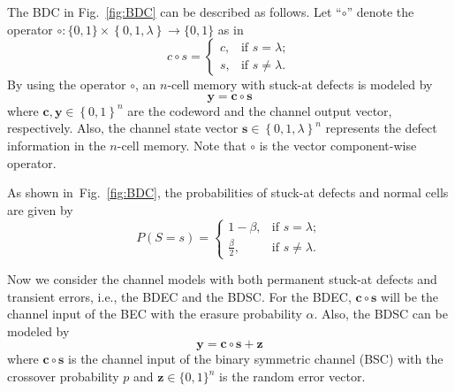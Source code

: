 \documentclass[10pt,twocolumn,twoside,submit]{JCNtran}
\begin{document}
	The BDC in Fig.~\ref{fig:BDC} can be described as follows. Let ``$\circ$'' denote the operator  $\circ:\{0, 1\} \times \left\{0, 1, \lambda\right\} \rightarrow \{0, 1\}$ as in~\cite{Heegard1983plbc}
	\begin{equation}\label{eq:circ_operator}
		c \circ s =
		\begin{cases}
		c, & \text{if } s = \lambda ; \\
		s, & \text{if } s \ne \lambda.
		\end{cases}
	\end{equation}
	By using the operator $\circ$, an $n$-cell memory with stuck-at defects is modeled by 
	\begin{equation}
	\mathbf{y} = \mathbf{c} \circ \mathbf{s} \label{eq:BDC_vector}
	\end{equation}
	where ${\mathbf{c}}, {\mathbf{y}}\in \left\{0, 1\right\}^n$ are the codeword and the channel output vector, respectively. Also, the channel state vector ${\mathbf{s}} \in \left\{ 0, 1, \lambda \right\}^n$ represents the defect information in the $n$-cell memory.  Note that $\circ$ is the vector component-wise operator.
	
	As shown in~Fig.~\ref{fig:BDC}, the probabilities of stuck-at defects and normal cells are given by 
	\begin{equation}\label{eq:BDC_prob}
		P(S = s) = 
		\begin{cases}
		1 - \beta, & \text{if } s = \lambda ; \\
		\frac{\beta}{2}, & \text{if } s \ne \lambda.
		\end{cases}
	\end{equation}

	Now we consider the channel models with both permanent stuck-at defects and transient errors, i.e., the BDEC and the BDSC. For the BDEC, $\mathbf{c} \circ \mathbf{s}$ will be the channel input of the BEC with the erasure probability $\alpha$. Also, the BDSC can be modeled by
	\begin{equation}
		\mathbf{y} = \mathbf{c} \circ \mathbf{s} + \mathbf{z} \label{eq:BDSC_vector}
	\end{equation}
	where $\mathbf{c} \circ \mathbf{s}$ is the channel input of the binary symmetric channel (BSC) with the crossover probability $p$ and ${\mathbf{z}} \in \{0, 1\}^n$ is the random error vector. 
	
\end{document}
